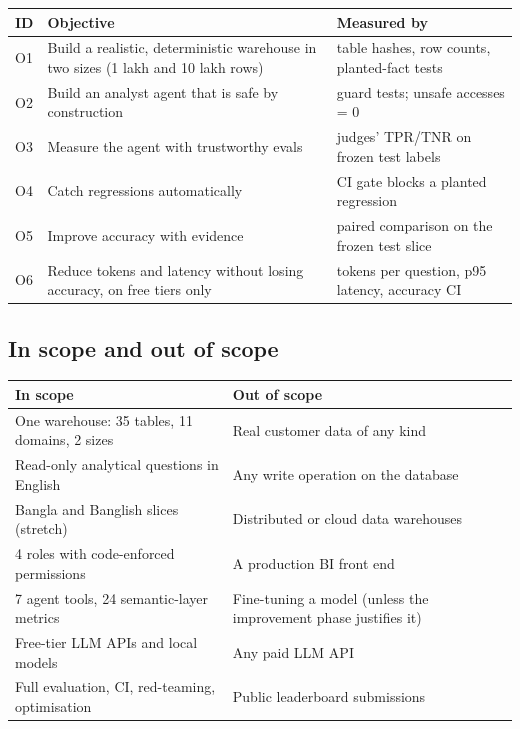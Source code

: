 \documentclass[11pt,a4paper]{article}
\begin{document}
\begin{center}
\small
\begin{tabularx}{\linewidth}{@{}l X l@{}}
\toprule
\textbf{ID} & \textbf{Objective} & \textbf{Measured by}\\
\midrule
O1 & Build a realistic, deterministic warehouse in two sizes (1 lakh and 10 lakh rows) & table hashes, row counts, planted-fact tests\\
O2 & Build an analyst agent that is safe by construction & guard tests; unsafe accesses = 0\\
O3 & Measure the agent with trustworthy evals & judges' TPR/TNR on frozen test labels\\
O4 & Catch regressions automatically & CI gate blocks a planted regression\\
O5 & Improve accuracy with evidence & paired comparison on the frozen test slice\\
O6 & Reduce tokens and latency without losing accuracy, on free tiers only & tokens per question, p95 latency, accuracy CI\\
\bottomrule
\end{tabularx}
\end{center}

\subsection{In scope and out of scope}

\begin{center}
\small
\begin{tabularx}{\linewidth}{@{}X X@{}}
\toprule
\textbf{In scope} & \textbf{Out of scope}\\
\midrule
One warehouse: 35 tables, 11 domains, 2 sizes & Real customer data of any kind\\
Read-only analytical questions in English & Any write operation on the database\\
Bangla and Banglish slices (stretch) & Distributed or cloud data warehouses\\
4 roles with code-enforced permissions & A production BI front end\\
7 agent tools, 24 semantic-layer metrics & Fine-tuning a model (unless the improvement phase justifies it)\\
Free-tier LLM APIs and local models & Any paid LLM API\\
Full evaluation, CI, red-teaming, optimisation & Public leaderboard submissions\\
\bottomrule
\end{tabularx}
\end{center}
\end{document}
